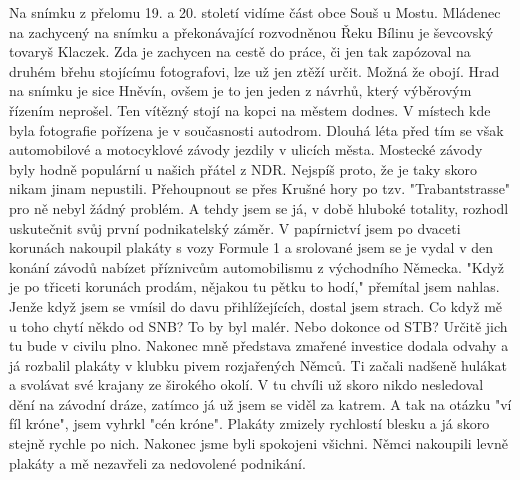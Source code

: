 
Na snímku z přelomu 19. a 20. století vidíme část obce Souš u Mostu.
Mládenec na zachycený na snímku a překonávající rozvodněnou Řeku
Bílinu je ševcovský tovaryš Klaczek. Zda je zachycen na cestě do
práce, či jen tak zapózoval na druhém břehu stojícímu fotografovi, lze
už jen ztěží určit. Možná že obojí. Hrad na snímku je sice Hněvín,
ovšem je to jen jeden z návrhů, který výběrovým řízením neprošel. Ten
vítězný stojí na kopci na městem dodnes. V místech kde byla fotografie
pořízena je v současnosti autodrom. Dlouhá léta před tím se však
automobilové a motocyklové závody jezdily v ulicích města. Mostecké
závody byly hodně populární u našich přátel z NDR. Nejspíš proto, že
je taky skoro nikam jinam nepustili. Přehoupnout se přes Krušné hory
po tzv. "Trabantstrasse" pro ně nebyl žádný problém. A tehdy jsem se
já, v době hluboké totality, rozhodl uskutečnit svůj první
podnikatelský záměr. V papírnictví jsem po dvaceti korunách nakoupil
plakáty s vozy Formule 1 a srolované jsem se je vydal v den konání
závodů nabízet příznivcům automobilismu z východního Německa. "Když je
po třiceti korunách prodám, nějakou tu pětku to hodí," přemítal jsem
nahlas. Jenže když jsem se vmísil do davu přihlížejících, dostal jsem
strach. Co když mě u toho chytí někdo od SNB? To by byl malér. Nebo
dokonce od STB? Určitě jich tu bude v civilu plno. Nakonec mně
představa zmařené investice dodala odvahy a já rozbalil plakáty v
klubku pivem rozjařených Němců. Ti začali nadšeně hulákat a svolávat
své krajany ze širokého okolí. V tu chvíli už skoro nikdo nesledoval
dění na závodní dráze, zatímco já už jsem se viděl za katrem. A tak na
otázku "ví fíl króne", jsem vyhrkl "cén króne". Plakáty zmizely
rychlostí blesku a já skoro stejně rychle po nich. Nakonec jsme byli
spokojeni všichni. Němci nakoupili levně plakáty a mě nezavřeli za
nedovolené podnikání.

